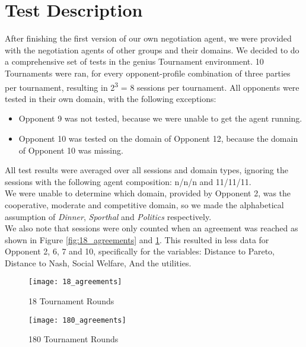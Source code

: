 \section{Test Description}

After finishing the first version of our own negotiation agent, we were provided with the negotiation agents of other groups and their domains. We decided to do a comprehensive set of tests in the genius Tournament environment. 10 Tournaments were ran, for every opponent-profile combination of three parties per tournament, resulting in 2\textsuperscript{3} = 8 sessions per tournament. All opponents were tested in their own domain, with the following exceptions:

\begin{itemize}
	\item Opponent 9 was not tested, because we were unable to get the agent running. 
	\item Opponent 10 was tested on the domain of Opponent 12, because the domain of Opponent 10 was missing.
\end{itemize}

All test results were averaged over all sessions and domain types, ignoring the sessions with the following agent composition: n/n/n and 11/11/11.\\

We were unable to determine which domain, provided by Opponent 2, was the cooperative, moderate and competitive domain, so we made the alphabetical assumption of \textit{Dinner}, \textit{Sporthal} and \textit{Politics} respectively. \\

We also note that sessions were only counted when an agreement was reached as shown in Figure \ref{fig:18_agreements} and \ref{fig:180_agreements}. This resulted in less data for Opponent 2, 6, 7 and 10, specifically for the variables: Distance to Pareto, Distance to Nash, Social Welfare, And the utilities.

\begin{figure}[!htb]
	\texttt{[image: 18\_agreements]}
	\caption{18 Tournament Rounds}
	\label{fig:18_agreements}
	\endminipage\hfill
	\texttt{[image: 180\_agreements]}
	\caption{180 Tournament Rounds}
	\label{fig:180_agreements}
	\endminipage\hfill
\end{figure}